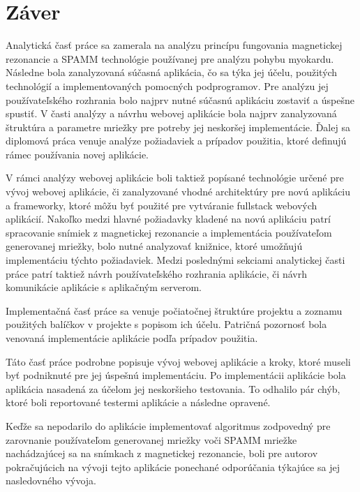\chapter {Záver}
Analytická časť práce sa zamerala na analýzu princípu fungovania magnetickej rezonancie a SPAMM technológie používanej pre analýzu pohybu myokardu. Následne bola zanalyzovaná súčasná aplikácia, čo sa týka jej účelu, použitých technológií a implementovaných pomocných podprogramov. Pre analýzu jej používateľského rozhrania bolo najprv nutné súčasnú aplikáciu zostaviť a úspešne spustiť. V časti analýzy a návrhu webovej aplikácie bola najprv zanalyzovaná štruktúra a parametre mriežky pre potreby jej neskoršej implementácie. Ďalej sa diplomová práca venuje analýze požiadaviek a prípadov použitia, ktoré definujú rámec používania novej aplikácie.

V rámci analýzy webovej aplikácie boli taktiež popísané technológie určené pre vývoj webovej aplikácie, či zanalyzované vhodné architektúry pre novú aplikáciu a frameworky, ktoré môžu byť použité pre vytváranie fullstack webových aplikácií. Nakoľko medzi hlavné požiadavky kladené na novú aplikáciu patrí spracovanie snímiek z magnetickej rezonancie a implementácia používateľom generovanej mriežky, bolo nutné analyzovať knižnice, ktoré umožňujú implementáciu týchto požiadaviek. Medzi poslednými sekciami analytickej časti práce patrí taktiež návrh používateľského rozhrania aplikácie, či návrh komunikácie aplikácie s aplikačným serverom.

Implementačná časť práce sa venuje počiatočnej štruktúre projektu a zoznamu použitých balíčkov v projekte s popisom ich účelu. Patričná pozornosť bola venovaná implementácie aplikácie podľa prípadov použitia.

Táto časť práce podrobne popisuje vývoj webovej aplikácie a kroky, ktoré museli byť podniknuté pre jej úspešnú implementáciu. Po implementácii aplikácie bola aplikácia nasadená za účelom jej neskoršieho testovania. To odhalilo pár chýb, ktoré boli reportované testermi aplikácie a následne opravené.

Keďže sa nepodarilo do aplikácie implementovať algoritmus zodpovedný pre zarovnanie používateľom generovanej mriežky voči SPAMM mriežke nachádzajúcej sa na snímkach z magnetickej rezonancie, boli pre autorov pokračujúcich na vývoji tejto aplikácie ponechané odporúčania týkajúce sa jej nasledovného vývoja.